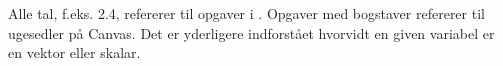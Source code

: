 \documentclass[11pt]{book}
\begin{document}
\frontmatter
		\tableofcontents
		
\mainmatter 

Alle tal, f.eks. 2.4, refererer til opgaver i \cite{hesselholt2017}. Opgaver med bogstaver refererer til ugesedler på Canvas. Det er yderligere indforstået hvorvidt en given variabel er en vektor eller skalar.

	

\backmatter

	
\end{document}
